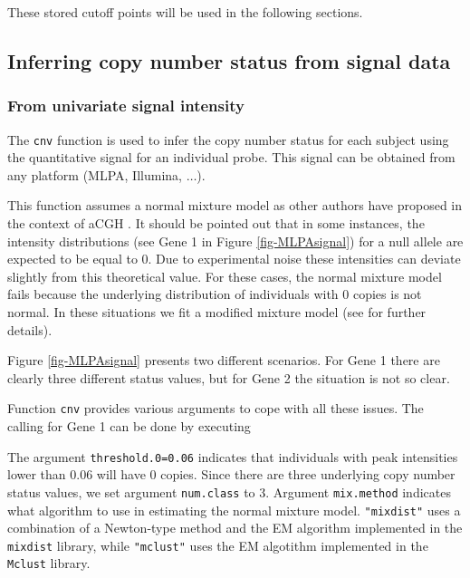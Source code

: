 \documentclass[11pt]{article}
\begin{document}
These stored cutoff points will be used in the following sections.




\clearpage

\subsection{Inferring copy number status from signal data}



\subsubsection{From univariate signal intensity}


The \texttt{cnv} function is used to infer the copy number status for each subject using the quantitative signal for an individual probe. 
This signal can be obtained from any platform (MLPA, Illumina, $\ldots$).

This function assumes a normal mixture model as other authors have proposed in the context of aCGH \cite{PicRobLeb07, vanKimVos07}. 
It should be pointed out that in some instances, the intensity distributions (see Gene 1 in Figure \ref{fig-MLPAsignal}) for a null 
allele are expected to be equal to 0. Due to experimental noise these intensities can deviate slightly from this theoretical value.
 For these cases, the normal mixture model fails because the underlying distribution of individuals with 0 copies is not normal. 
 In these situations we fit a modified mixture model (see \cite{GonSubEsc09} for further details).

Figure \ref{fig-MLPAsignal} presents two different scenarios. For Gene 1 there are clearly three different status values,  but for Gene 2 the situation is not so clear.

Function {\tt cnv} provides various arguments to cope with all these issues. The calling for Gene 1 can be done by executing


\begin{Schunk}
\end{Schunk}


The argument {\tt threshold.0=0.06} indicates that individuals with peak intensities lower than 0.06 will have 0 copies. 
Since there are three underlying copy number status values, we set argument {\tt num.class} to 3. 
Argument {\tt mix.method} indicates what algorithm to use in estimating the normal mixture model. 
{\tt "mixdist"} uses a combination of a Newton-type method and the EM algorithm implemented in the {\tt mixdist} library, 
while {\tt "mclust"} uses the EM algotithm implemented in the {\tt Mclust} library.
\end{document}
